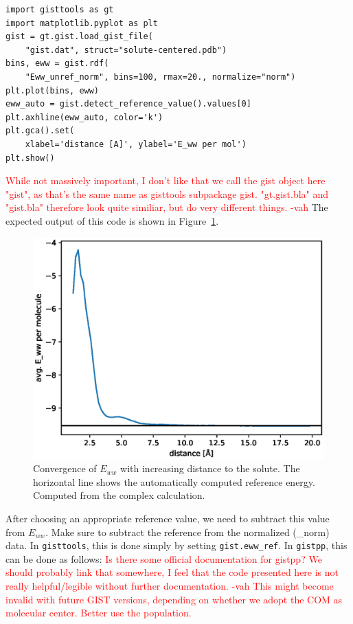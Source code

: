 \documentclass[9pt,tutorial]{livecoms}
\newcommand{\software}{\texttt}
\newcommand{\todo}{\textcolor{red}}
\newcommand\inlinecode{\texttt}
\begin{document}
\begin{lstlisting}[style=python]
import gisttools as gt
import matplotlib.pyplot as plt
gist = gt.gist.load_gist_file(
    "gist.dat", struct="solute-centered.pdb")
bins, eww = gist.rdf(
    "Eww_unref_norm", bins=100, rmax=20., normalize="norm")
plt.plot(bins, eww)
eww_auto = gist.detect_reference_value().values[0]
plt.axhline(eww_auto, color='k')
plt.gca().set(
    xlabel='distance [A]', ylabel='E_ww per mol')
plt.show()
\end{lstlisting}
\todo{While not massively important, I don't like that we call the gist object here "gist", as that's the same name as gisttools subpackage gist. "gt.gist.bla" and "gist.bla" therefore look quite similiar, but do very different things. -vah}
The expected output of this code is shown in Figure~\ref{fig_ewwref}.

\begin{figure}
	\centering
	\includegraphics[width=0.8\linewidth]{figures/Eww_convergence.eps}
	\caption{Convergence of $E_{ww}$ with increasing distance to the solute. The horizontal line shows the automatically computed reference energy. Computed from the complex calculation.}\label{fig_ewwref}
\end{figure}

After choosing an appropriate reference value, we need to subtract this value from $E_{ww}$.
Make sure to subtract the reference from the normalized (\_norm) data.
In \software{gisttools}, this is done simply by setting \inlinecode{gist.eww\_ref}.
In \software{gistpp}, this can be done as follows: 
\todo{Is there some official documentation for gistpp? We should probably link that somewhere, I feel that the code presented here is not really helpful/legible without further documentation. -vah}
\todo{This might become invalid with future GIST versions, depending on whether we adopt the COM as molecular center.} 
\todo{Better use the population.}
\end{document}
